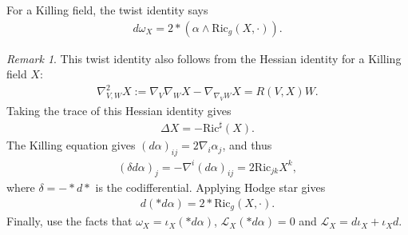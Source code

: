 \documentclass[letterpaper]{amsart}
\theoremstyle{definition}
\theoremstyle{remark}
\newtheorem{rmk}{Remark}[section]
\begin{document}
For a Killing field, the twist identity says
\begin{align*}
	d \omega _{X} = 2 * \left( \alpha \wedge \mathrm{Ric}_g(X, \cdot ) \right) .
\end{align*} 
\begin{rmk}
	This twist identity also follows from the Hessian identity for a Killing field $X$:
\begin{align*}
	\nabla ^2_{V, W}X := \nabla _{V} \nabla _{W} X - \nabla _{\nabla _{V} W} X = R(V, X) W.
\end{align*} 
Taking the trace of this Hessian identity gives
\begin{align*}
	\Delta X = - \mathrm{Ric} ^{\sharp}(X).
\end{align*} 
The Killing equation gives $(d \alpha )_{ij} = 2 \nabla _{i} \alpha _j$, and thus
\begin{align*}
	(\delta d \alpha )_{j} = - \nabla ^{i}(d \alpha )_{ij} = 2 \mathrm{Ric}_{jk} X ^{k},
\end{align*} 
where $\delta = - * d *$ is the codifferential. Applying Hodge star gives
\begin{align*}
	d (* d \alpha ) = 2 * \mathrm{Ric}_g(X, \cdot ).
\end{align*} 
Finally, use the facts that $\omega _{X} = \iota _{X}(* d \alpha )$, $\mathcal{L}_{X} (* d \alpha ) =0$ and $\mathcal{L}_{X} = d \iota _{X} + \iota _{X} d$.
\end{rmk}

\end{document}
